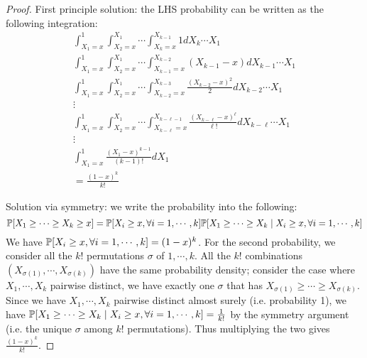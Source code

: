 \documentclass[11pt,a4paper]{article}
\begin{document}
\begin{enumerate}
\begin{proof}
	    	First principle solution: the LHS probability can be written as the following integration: 
	    	\begin{align}
	    		\int_{X_1=x}^1 \int_{X_2=x}^{X_1}\cdots \int_{X_k=x}^{X_{k-1}} 1 dX_k\cdots X_1
	    		\nonumber\\
	    		\int_{X_1=x}^1 \int_{X_2=x}^{X_1}\cdots \int_{X_{k-1}=x}^{X_{k-2}} (X_{k - 1} - x) dX_{k-1}\cdots X_1
	    		\nonumber\\
	    		\int_{X_1=x}^1 \int_{X_2=x}^{X_1}\cdots \int_{X_{k-2}=x}^{X_{k-3}} \frac{(X_{k - 2} - x)^2}{2} dX_{k-2}\cdots X_1
	    		\nonumber\\
	    		\vdots
	    		\nonumber\\
	    		\int_{X_1=x}^1 \int_{X_2=x}^{X_1}\cdots \int_{X_{k-\ell}=x}^{X_{k-\ell-1}} \frac{(X_{k - \ell} - x)^{\ell}}{\ell!} dX_{k-\ell}\cdots X_1
	    		\nonumber\\
	    		\vdots
	    		\nonumber\\
	    		\int_{X_1=x}^1 \frac{(X_1-x)^{k-1}}{(k-1)!} dX_1
	    		\nonumber\\
	    		=\frac{(1-x)^k}{k!}
	    	\end{align}
    	
    	    Solution via symmetry: we write the probability into the following: 
    	    \begin{equation}
    	    	{\mathbb P}[X_1\ge \cdots \ge X_k\ge x] = 
    	    	{\mathbb P}[X_i\ge x, \forall i=1, \cdots, k]
    	    	{\mathbb P}[X_1\ge\cdots \ge X_k \mid X_i\ge x, \forall i=1, \cdots, k]
    	    \end{equation}
            We have ${\mathbb P}[X_i\ge x, \forall i=1, \cdots, k]=(1-x)^k$. 
            For the second probability, we consider all the $k!$ permutations $\sigma$ of $1, \cdots, k$. 
            All the $k!$ combinations $(X_{\sigma(1)}, \cdots, X_{\sigma(k)})$ have the same probability density; 
            consider the case where $X_1, \cdots, X_k$ pairwise distinct, 
            we have exactly one $\sigma$ that has $X_{\sigma(1)}\ge\cdots\ge X_{\sigma(k)}$. 
            Since we have $X_1, \cdots, X_k$ pairwise distinct almost surely (i.e. probability 1), 
            we have ${\mathbb P}[X_1\ge\cdots \ge X_k \mid X_i\ge x, \forall i=1, \cdots, k]=\frac{1}{k!}$ 
            by the symmetry argument (i.e. the unique $\sigma$ among $k!$ permutations). 
            Thus multiplying the two gives $\frac{(1-x)^k}{k!}$. 
	    \end{proof}
        

\end{enumerate}
\end{document}
